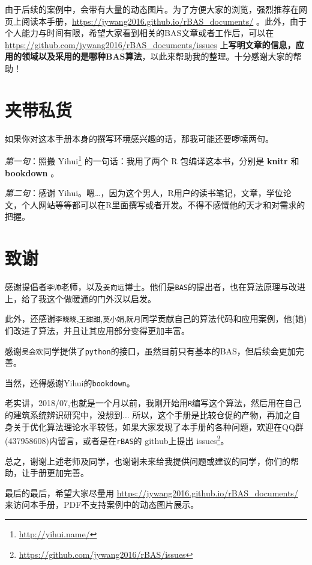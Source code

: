 \documentclass[]{ctexbook}
\renewcommand{\href}[2]{#2\footnote{\url{#1}}}
\begin{document}
由于后续的案例中，会带有大量的动态图片。为了方便大家的浏览，强烈推荐在网页上阅读本手册，\url{https://jywang2016.github.io/rBAS_documents/}
。此外，由于个人能力与时间有限，希望大家看到相关的BAS文章或者工作后，可以在
\url{https://github.com/jywang2016/rBAS_documents/issues}
上\textbf{写明文章的信息，应用的领域以及采用的是哪种BAS算法}，以此来帮助我的整理。十分感谢大家的帮助！

\section*{夹带私货}


如果你对这本手册本身的撰写环境感兴趣的话，那我可能还要啰嗦两句。

\emph{第一句}：照搬 \href{http://yihui.name/}{Yihui}
的一句话：我用了两个 R 包编译这本书，分别是 \textbf{knitr}
\citep{xie2015} 和 \textbf{bookdown}
\citep{R-bookdown}。

\emph{第二句}：感谢
Yihui。嗯\ldots{}，因为这个男人，R用户的读书笔记，文章，学位论文，个人网站等等都可以在R里面撰写或者开发。不得不感慨他的天才和对需求的把握。

\section*{致谢}


感谢提倡者\texttt{李帅}老师，以及\texttt{姜向远}博士。他们是\texttt{BAS}的提出者，也在算法原理与改进上，给了我这个做暖通的门外汉以启发。

此外，还感谢\texttt{李晓晓},\texttt{王甜甜},\texttt{莫小娟},\texttt{阮月}同学贡献自己的算法代码和应用案例，他(她)们改进了算法，并且让其应用部分变得更加丰富。

感谢\texttt{吴会欢}同学提供了\texttt{python}的接口，虽然目前只有基本的BAS，但后续会更加完善。

当然，还得感谢Yihui的\texttt{bookdown}。

老实讲，2018/07,也就是一个月以前，我刚开始用\texttt{R}编写这个算法，然后用在自己的建筑系统辨识研究中，没想到\(\dots\)
所以，这个手册是比较仓促的产物，再加之自身关于优化算法理论水平较低，如果大家发现了本手册的各种问题，欢迎在QQ群(437958608)内留言，或者是在\texttt{rBAS}的
github上提出 \href{https://github.com/jywang2016/rBAS/issues}{issues}。

总之，谢谢上述老师及同学，也谢谢未来给我提供问题或建议的同学，你们的帮助，让手册更加完善。

最后的最后，希望大家尽量用
\url{https://jywang2016.github.io/rBAS_documents/}
来访问本手册，PDF不支持案例中的动态图片展示。
\end{document}
